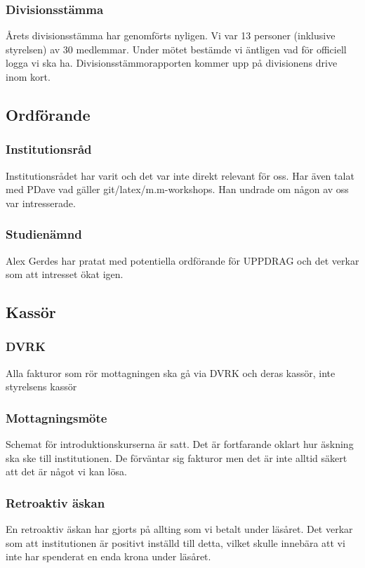 \documentclass[protokoll]{dvd}
\begin{document}
    \subsubsection*{Divisionsstämma}
    Årets divisionsstämma har genomförts nyligen. Vi var 13 personer (inklusive styrelsen) av 30 medlemmar.
    Under mötet bestämde vi äntligen vad för officiell logga vi ska ha.
    Divisionsstämmorapporten kommer upp på divisionens drive inom kort.

\newpage

\subsection{Ordförande}

    \subsubsection*{Institutionsråd}
    Institutionsrådet har varit och det var inte direkt relevant för oss.
    Har även talat med PDave vad gäller git/latex/m.m-workshops.
    Han undrade om någon av oss var intresserade. 

    \subsubsection*{Studienämnd}
    Alex Gerdes har pratat med potentiella ordförande för UPPDRAG och det verkar som att intresset ökat igen.

\subsection{Kassör}

    \subsubsection*{DVRK}
    Alla fakturor som rör mottagningen ska gå via DVRK och deras kassör, inte styrelsens kassör

    \subsubsection*{Mottagningsmöte}
    Schemat för introduktionskurserna är satt. Det är fortfarande oklart hur äskning ska ske till institutionen.
    De förväntar sig fakturor men det är inte alltid säkert att det är något vi kan lösa.

    \subsubsection*{Retroaktiv äskan}
    En retroaktiv äskan har gjorts på allting som vi betalt under läsåret.
    Det verkar som att institutionen är positivt inställd till detta, vilket skulle innebära att vi inte har spenderat en enda krona under läsåret.
\end{document}
